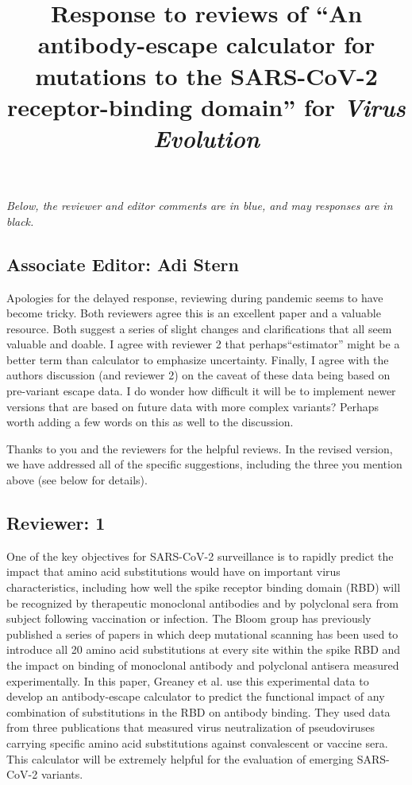 \documentclass[11pt, oneside]{article}   	%
\title{Response to reviews of ``An antibody-escape calculator for mutations to the SARS-CoV-2 receptor-binding domain'' for \textit{Virus Evolution}}
\author{}
\newcommand{\response}[1]{{\color{black}#1}}
\begin{document}
\maketitle

\emph{Below, the reviewer and editor comments {\color{blue} are in blue}, and may responses are in black.}

\color{blue}

\subsection*{Associate Editor: Adi Stern}

Apologies for the delayed response, reviewing during pandemic seems to have become tricky.
Both reviewers agree this is an excellent paper and a valuable resource.
Both suggest a series of slight changes and clarifications that all seem valuable and doable.
I agree with reviewer 2 that perhaps``estimator'' might be a better term than calculator to emphasize uncertainty. 
Finally, I agree with the authors discussion (and reviewer 2) on the caveat of these data being based on pre-variant escape data.
I do wonder how difficult it will be to implement newer versions that are based on future data with more complex variants?
Perhaps worth adding a few words on this as well to the discussion.

\response{Thanks to you and the reviewers for the helpful reviews. In the revised version, we have addressed all of the specific suggestions, including the three you mention above (see below for details).}

\subsection*{Reviewer: 1}

One of the key objectives for SARS-CoV-2 surveillance is to rapidly predict the impact that amino acid substitutions would have on important virus characteristics, including how well the spike receptor binding domain (RBD) will be recognized by therapeutic monoclonal antibodies and by polyclonal sera from subject following vaccination or infection.  The Bloom group has previously published a series of papers in which deep mutational scanning has been used to introduce all 20 amino acid substitutions at every site within the spike RBD and the impact on binding of monoclonal antibody and polyclonal antisera measured experimentally.  In this paper, Greaney et al. use this experimental data to develop an antibody-escape calculator to predict the functional impact of any combination of substitutions in the RBD on antibody binding.  They used data from three publications that measured virus neutralization of pseudoviruses carrying specific amino acid substitutions against convalescent or vaccine sera.  This calculator will be extremely helpful for the evaluation of emerging SARS-CoV-2 variants.  
\end{document}
